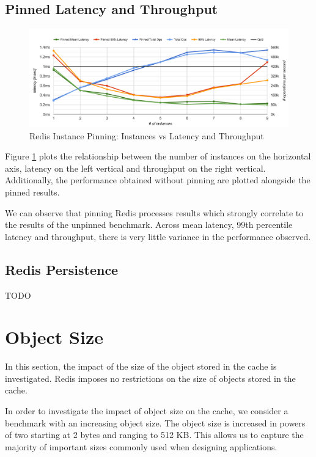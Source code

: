 \subsection{Pinned Latency and Throughput}

\begin{figure}[h]
    \includegraphics[width=\textwidth]{./res/6_pinned.png}
    \caption{Redis Instance Pinning: Instances vs Latency and Throughput}
    \label{fig:6_pinned.png}
\end{figure}

Figure \ref{fig:6_pinned.png} plots the relationship between the number of instances on the horizontal axis, latency on the left vertical and throughput on the right vertical. Additionally, the performance obtained without pinning are plotted alongside the pinned results.

We can observe that pinning  Redis processes results which strongly correlate to the results of the unpinned benchmark. Across mean latency, 99th percentile latency and throughput, there is very little variance in the performance observed.


\subsection{Redis Persistence}
TODO


\section{Object Size}
In this section, the impact of the size of the object stored in the cache is investigated. Redis imposes no restrictions on the size of objects stored in the cache.

In order to investigate the impact of object size on the cache, we consider a benchmark with an increasing object size. The object size is increased in powers of two starting at 2 bytes and ranging to 512 KB. This allows us to capture the majority of important sizes commonly used when designing applications.

